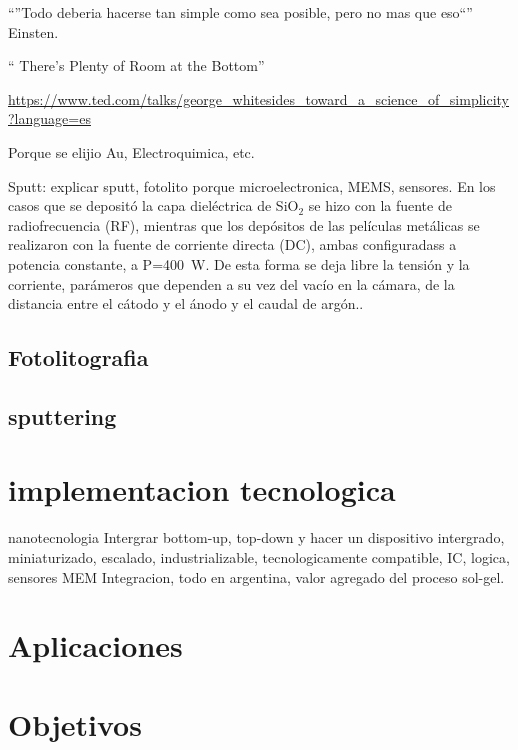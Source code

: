 ``''Todo deberia hacerse tan simple como sea posible, pero no mas que eso``'' Einsten.

`` There's Plenty of Room at the Bottom''

\url{https://www.ted.com/talks/george_whitesides_toward_a_science_of_simplicity?language=es}\cite{ted_whitesides2010}

Porque se elijio Au, Electroquimica, etc.

Sputt: explicar sputt, fotolito porque microelectronica, MEMS, sensores.
En los casos que se depositó la capa dieléctrica de SiO$_2$ se hizo con la fuente de radiofrecuencia (RF), mientras que los depósitos de las películas metálicas se realizaron con la fuente de corriente directa (DC), ambas configuradass a potencia constante, a P=\SI{400}{\watt}.  De esta forma se deja libre la tensión y la corriente, parámeros que dependen a su vez del vacío en la cámara, de la distancia entre el cátodo y el ánodo y el caudal de argón.\cite{sigmund1968}. 

\subsection{Fotolitografia}\label{sec:intro_fotolito}

\subsection{sputtering}

\section{implementacion tecnologica}
nanotecnologia\cite{Gimenez2017}
Intergrar bottom-up, top-down y hacer un dispositivo intergrado, miniaturizado, escalado, industrializable, tecnologicamente compatible, IC, logica, sensores MEM
Integracion, todo en argentina, valor agregado del proceso sol-gel.\cite{Volksen2010}

\section{Aplicaciones}

\section{Objetivos}